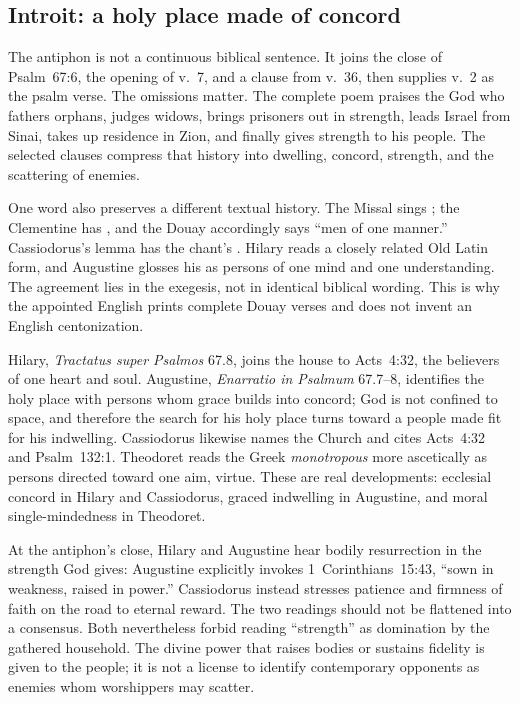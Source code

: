 \subsection*{Introit: a holy place made of concord\enspace{}}

The antiphon is not a continuous biblical sentence. It joins the close of
Psalm~67:6, the opening of v.~7, and a clause from v.~36, then supplies v.~2
as the psalm verse. The omissions matter. The complete poem praises the God
who fathers orphans, judges widows, brings prisoners out in strength, leads
Israel from Sinai, takes up residence in Zion, and finally gives strength to
his people. The selected clauses compress that history into dwelling,
concord, strength, and the scattering of enemies.

One word also preserves a different textual history. The Missal sings
; the Clementine has ,
and the Douay accordingly says ``men of one manner.'' Cassiodorus's lemma has
the chant's . Hilary reads a closely related Old Latin form,
and Augustine glosses his  as persons of one mind and one
understanding. The agreement lies in the exegesis, not in identical biblical
wording. This is why the appointed English prints complete Douay verses and
does not invent an English centonization.

Hilary, \emph{Tractatus super Psalmos} 67.8, joins the house to Acts~4:32,
the believers of one heart and soul. Augustine, \emph{Enarratio in Psalmum}
67.7--8, identifies the holy place with persons whom grace builds into
concord; God is not confined to space, and therefore the search for his holy
place turns toward a people made fit for his indwelling. Cassiodorus likewise
names the Church and cites Acts~4:32 and Psalm~132:1. Theodoret reads the
Greek \emph{monotropous} more ascetically as persons directed toward one aim,
virtue. These are real developments: ecclesial concord in Hilary and
Cassiodorus, graced indwelling in Augustine, and moral single-mindedness in
Theodoret.

At the antiphon's close, Hilary and Augustine hear bodily resurrection in the
strength God gives: Augustine explicitly invokes 1~Corinthians~15:43,
``sown in weakness, raised in power.'' Cassiodorus instead stresses patience
and firmness of faith on the road to eternal reward. The two readings should
not be flattened into a consensus. Both nevertheless forbid reading
``strength'' as domination by the gathered household. The divine power that
raises bodies or sustains fidelity is given to the people; it is not a license
to identify contemporary opponents as enemies whom worshippers may scatter.

